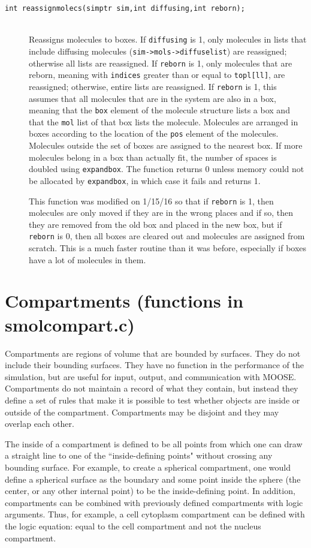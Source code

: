 \documentclass {book}
\begin{document}
\begin{description}
\item[\texttt{int reassignmolecs(simptr sim,int diffusing,int reborn);}]
\hfill \\
Reassigns molecules to boxes.  If \texttt{diffusing} is 1, only molecules in lists that include diffusing molecules (\texttt{sim->mols->diffuselist}) are reassigned; otherwise all lists are reassigned.  If \texttt{reborn} is 1, only molecules that are reborn, meaning with \texttt{indices} greater than or equal to \texttt{topl[ll]}, are reassigned; otherwise, entire lists are reassigned.  If \texttt{reborn} is 1, this assumes that all molecules that are in the system are also in a box, meaning that the \texttt{box} element of the molecule structure lists a box and that the \texttt{mol} list of that box lists the molecule.  Molecules are arranged in boxes according to the location of the \texttt{pos} element of the molecules.  Molecules outside the set of boxes are assigned to the nearest box.  If more molecules belong in a box than actually fit, the number of spaces is doubled using \texttt{expandbox}.  The function returns 0 unless memory could not be allocated by \texttt{expandbox}, in which case it fails and returns 1.

This function was modified on 1/15/16 so that if \texttt{reborn} is 1, then molecules are only moved if they are in the wrong places and if so, then they are removed from the old box and placed in the new box, but if \texttt{reborn} is 0, then all boxes are cleared out and molecules are assigned from scratch.  This is a much faster routine than it was before, especially if boxes have a lot of molecules in them.

\end{description}

\section{Compartments (functions in smolcompart.c)}

Compartments are regions of volume that are bounded by surfaces.  They do not include their bounding surfaces.  They have no function in the performance of the simulation, but are useful for input, output, and communication with MOOSE.  Compartments do not maintain a record of what they contain, but instead they define a set of rules that make it is possible to test whether objects are inside or outside of the compartment.  Compartments may be disjoint and they may overlap each other.

The inside of a compartment is defined to be all points from which one can draw a straight line to one of the ``inside-defining points" without crossing any bounding surface.  For example, to create a spherical compartment, one would define a spherical surface as the boundary and some point inside the sphere (the center, or any other internal point) to be the inside-defining point.  In addition, compartments can be combined with previously defined compartments with logic arguments.  Thus, for example, a cell cytoplasm compartment can be defined with the logic equation: equal to the cell compartment and not the nucleus compartment.
\end{document}
